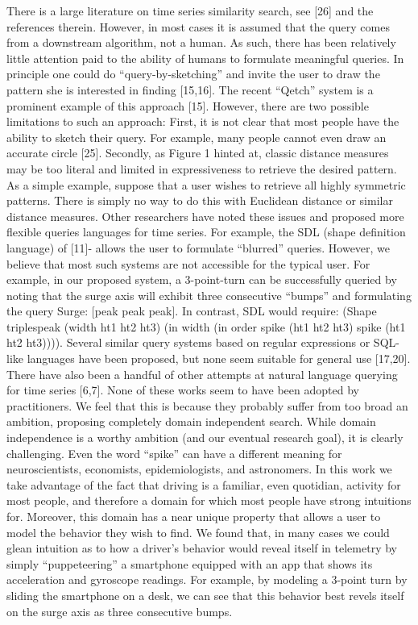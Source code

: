 There is a large literature on time series similarity search, see [26] and the references therein. However, in most cases it is assumed that the query comes from a downstream algorithm, not a human. As such, there has been relatively little attention paid to the ability of humans to formulate meaningful queries. In principle one could do “query-by-sketching” and invite the user to draw the pattern she is interested in finding [15,16]. The recent “Qetch” system is a prominent example of this approach [15]. However, there are two possible limitations to such an approach: First, it is not clear that most people have the ability to sketch their query. For example, many people cannot even draw an accurate circle [25]. Secondly, as Figure 1 hinted at, classic distance measures may be too literal and limited in expressiveness to retrieve the desired pattern. As a simple example, suppose that a user wishes to retrieve all highly symmetric patterns. There is simply no way to do this with Euclidean distance or similar distance measures.
Other researchers have noted these issues and proposed more flexible queries languages for time series. For example, the SDL (shape definition language) of [11]- allows the user to formulate “blurred” queries. However, we believe that most such systems are not accessible for the typical user. For example, in our proposed system, a 3-point-turn can be successfully queried by noting that the surge axis will exhibit three consecutive “bumps” and formulating the query Surge: [peak peak peak]. In contrast, SDL would require: 
(Shape triplespeak (width ht1 ht2 ht3) (in width (in order spike (ht1 ht2 ht3) spike (ht1 ht2 ht3)))). 
Several similar query systems based on regular expressions or SQL-like languages have been proposed, but none seem suitable for general use [17,20].	
There have also been a handful of other attempts at natural language querying for time series [6,7]. None of these works seem to have been adopted by practitioners. We feel that this is because they probably suffer from too broad an ambition, proposing completely domain independent search.  While domain independence is a worthy ambition (and our eventual research goal), it is clearly challenging. Even the word “spike” can have a different meaning for neuroscientists, economists, epidemiologists, and astronomers. In this work we take advantage of the fact that driving is a familiar, even quotidian, activity for most people, and therefore a domain for which most people have strong intuitions for. Moreover, this domain has a near unique property that allows a user to model the behavior they wish to find. We found that, in many cases we could glean intuition as to how a driver’s behavior would reveal itself in telemetry by simply “puppeteering” a smartphone equipped with an app that shows its acceleration and gyroscope readings. For example, by modeling a 3-point turn by sliding the smartphone on a desk, we can see that this behavior best revels itself on the surge axis as three consecutive bumps.


